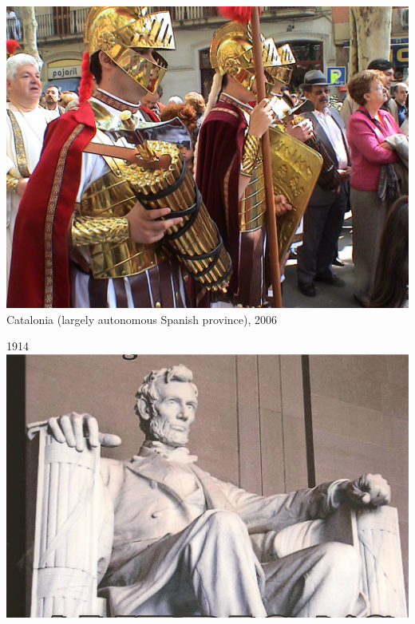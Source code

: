 \begin{frame}
    \centering
    \includegraphics[width=.9\textwidth]{img/fasces/fake-fasces.jpg} \\
    Catalonia (largely autonomous Spanish province), 2006 \\
\end{frame}
\begin{frame}{1914}
    \centering
    \includegraphics[width=.9\textwidth]{img/lincoln-memorial.jpg} \\
\end{frame}

